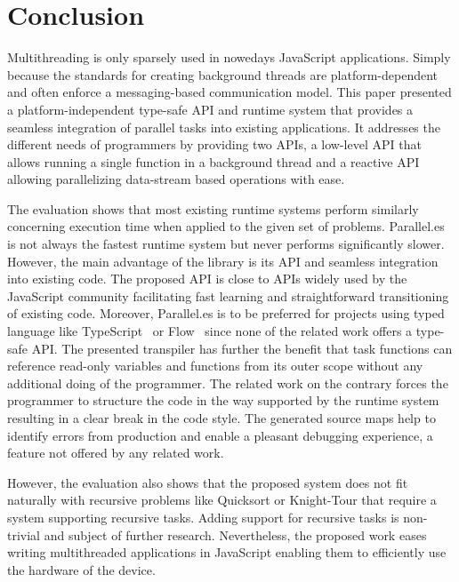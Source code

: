 \section{Conclusion}\label{sec:conclusion}
Multithreading is only sparsely used in nowedays JavaScript applications. Simply because the standards for creating background threads are platform-dependent and often enforce a messaging-based communication model. This paper presented a platform-independent type-safe API and runtime system that provides a seamless integration of parallel tasks into existing applications. It addresses the different needs of programmers by providing two APIs, a low-level API that allows running a single function in a background thread and a reactive API allowing parallelizing data-stream based operations with ease. 

The evaluation shows that most existing runtime systems perform similarly concerning execution time when applied to the given set of problems. Parallel.es is not always the fastest runtime system but never performs significantly slower. However, the main advantage of the library is its API and seamless integration into existing code. The proposed API is close to APIs widely used by the JavaScript community facilitating fast learning and straightforward transitioning of existing code. Moreover, Parallel.es is to be preferred for projects using typed language like TypeScript~\cite{typescript} or Flow~\cite{flow} since none of the related work offers a type-safe API. The presented transpiler has further the benefit that task functions can reference read-only variables and functions from its outer scope without any additional doing of the programmer. The related work on the contrary forces the programmer to structure the code in the way supported by the runtime system resulting in a clear break in the code style. The generated source maps help to identify errors from production and enable a pleasant debugging experience, a feature not offered by any related work. 

However, the evaluation also shows that the proposed system does not fit naturally with recursive problems like Quicksort or Knight-Tour that require a system supporting recursive tasks. Adding support for recursive tasks is non-trivial and subject of further research. Nevertheless, the proposed work eases writing multithreaded applications in JavaScript enabling them to efficiently use the hardware of the device.